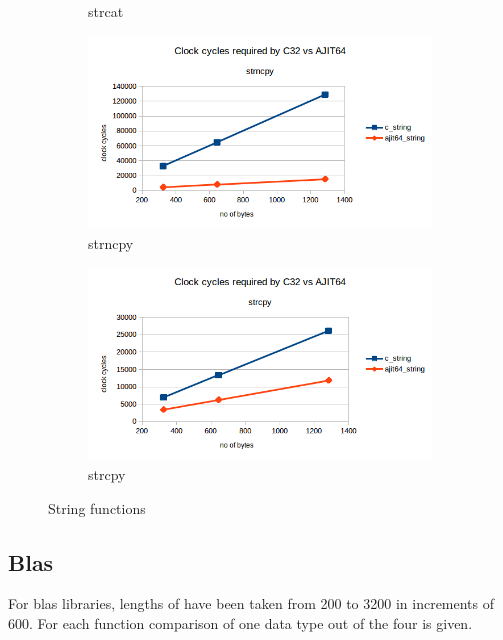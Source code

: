 \documentclass[12pt]{article}
\begin{document}
\begin{figure}[H]
\begin{subfigure}[b]{0.4\textwidth}
         \caption{strcat}
     \end{subfigure}
       \hfill
     \begin{subfigure}[b]{0.4\textwidth}
         \centering
         \includegraphics[width=\textwidth]{strncpy.png}
         \caption{strncpy}
         \end{subfigure}
       \hfill
     \begin{subfigure}[b]{0.4\textwidth}
         \centering
         \includegraphics[width=\textwidth]{strcpy.png}
         \caption{strcpy}
     \end{subfigure}
        \caption{String functions}
        \label{fig:three graphs}
\end{figure}


\subsection{Blas}

For blas libraries, lengths of have been taken from 200 to 3200 in increments of 600. For each function comparison of one data type out of the four is given.
\end{document}
